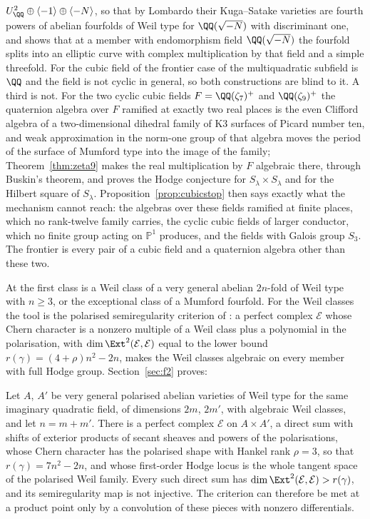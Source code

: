 $U_{\QQ}^{2}\oplus\langle-1\rangle\oplus\langle-N\rangle$, so that by Lombardo their Kuga--Satake varieties are fourth powers of abelian fourfolds of Weil type for $\QQ(\sqrt{-N})$ with discriminant one, and shows that at a member with endomorphism field $\QQ(\sqrt{-N})$ the fourfold splits into an elliptic curve with complex multiplication by that field and a simple threefold. For the cubic field of the frontier case of \cite{BMB26} the multiquadratic subfield is $\QQ$ and the field is not cyclic in general, so both constructions are blind to it. A third is not. For the two cyclic cubic fields $F=\QQ(\zeta_{7})^{+}$ and $\QQ(\zeta_{9})^{+}$ the quaternion algebra over $F$ ramified at exactly two real places is the even Clifford algebra of a two-dimensional dihedral family of K3 surfaces of Picard number ten, and weak approximation in the norm-one group of that algebra moves the period of the surface of Mumford type into the image of the family; Theorem~\ref{thm:zeta9} makes the real multiplication by $F$ algebraic there, through Buskin's theorem, and proves the Hodge conjecture for $S_{\lambda}\times S_{\lambda}$ and for the Hilbert square of $S_{\lambda}$. Proposition~\ref{prop:cubicstop} then says exactly what the mechanism cannot reach: the algebras over these fields ramified at finite places, which no rank-twelve family carries, the cyclic cubic fields of larger conductor, which no finite group acting on $\mathbb{P}^{1}$ produces, and the fields with Galois group $S_{3}$. The frontier is every pair of a cubic field and a quaternion algebra other than these two.

At \Fii{} the first class is a Weil class of a very general abelian $2n$-fold of Weil type with $n\ge3$, or the exceptional class of a Mumford fourfold. For the Weil classes the tool is the polarised semiregularity criterion of \cite{BMB26}: a perfect complex $\mathcal{E}$ whose Chern character is a nonzero multiple of a Weil class plus a polynomial in the polarisation, with $\dim\Ext^{2}(\mathcal{E},\mathcal{E})$ equal to the lower bound $r(\gamma)=(4+\rho)n^{2}-2n$, makes the Weil classes algebraic on every member with full Hodge group. Section~\ref{sec:f2} proves:

\begin{theorem}\label{thm:intro-product}
Let $A$, $A'$ be very general polarised abelian varieties of Weil type for the same imaginary quadratic field, of dimensions $2m$, $2m'$, with algebraic Weil classes, and let $n=m+m'$. There is a perfect complex $\mathcal{E}$ on $A\times A'$, a direct sum with shifts of exterior products of secant sheaves and powers of the polarisations, whose Chern character has the polarised shape with Hankel rank $\rho=3$, so that $r(\gamma)=7n^{2}-2n$, and whose first-order Hodge locus is the whole tangent space of the polarised Weil family. Every such direct sum has $\dim\Ext^{2}(\mathcal{E},\mathcal{E})>r(\gamma)$, and its semiregularity map is not injective. The criterion can therefore be met at a product point only by a convolution of these pieces with nonzero differentials.
\end{theorem}

